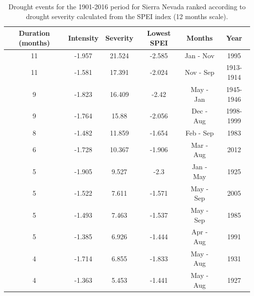 \begin{table}[h]
\caption{Drought events for the 1901-2016 period for Sierra Nevada ranked according to drought severity calculated from the SPEI index (12 months scale).}
\label{tab:dendro:droughts}
\centering
\begingroup\fontsize{9}{10}\selectfont
\begin{tabular}{@{}cccccc@{}}
\toprule
\textbf{Duration (months)} & \textbf{Intensity} & \textbf{Severity} & \textbf{Lowest SPEI} & \textbf{Months} & \textbf{Year} \\ \midrule
11 & -1.957 & 21.524 & -2.585 & Jan - Nov & 1995 \\
11 & -1.581 & 17.391 & -2.024 & Nov - Sep & 1913-1914 \\
9 & -1.823 & 16.409 & -2.42 & May - Jan & 1945-1946 \\
9 & -1.764 & 15.88 & -2.056 & Dec - Aug & 1998-1999 \\
8 & -1.482 & 11.859 & -1.654 & Feb - Sep & 1983 \\
6 & -1.728 & 10.367 & -1.906 & Mar - Aug & 2012 \\
5 & -1.905 & 9.527 & -2.3 & Jan - May & 1925 \\
5 & -1.522 & 7.611 & -1.571 & May - Sep & 2005 \\
5 & -1.493 & 7.463 & -1.537 & May - Sep & 1985 \\
5 & -1.385 & 6.926 & -1.444 & Apr - Aug & 1991 \\
4 & -1.714 & 6.855 & -1.833 & May - Aug & 1931 \\
4 & -1.363 & 5.453 & -1.441 & May - Aug & 1927 \\ \bottomrule
\end{tabular}
\endgroup{}
\end{table}


